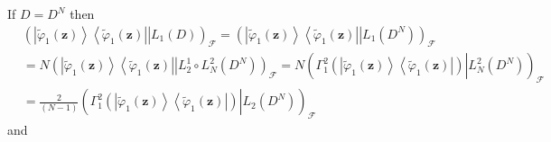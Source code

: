 \documentclass[aps,preprint]{revtex4}%
\begin{document}
If $D=D^{N}$ then
\begin{align}
&  \left(  \left.  \left\vert \tilde{\varphi}_{1}\left(  \mathbf{z}\right)
\right\rangle \left\langle \tilde{\varphi}_{1}\left(  \mathbf{z}\right)
\right\vert \right\vert L_{1}\left(  D\right)  \right)  _{\mathcal{F}}=\left(
\left.  \left\vert \tilde{\varphi}_{1}\left(  \mathbf{z}\right)  \right\rangle
\left\langle \tilde{\varphi}_{1}\left(  \mathbf{z}\right)  \right\vert
\right\vert L_{1}\left(  D^{N}\right)  \right)  _{\mathcal{F}}\nonumber\\
&  =N\left(  \left.  \left\vert \tilde{\varphi}_{1}\left(  \mathbf{z}\right)
\right\rangle \left\langle \tilde{\varphi}_{1}\left(  \mathbf{z}\right)
\right\vert \right\vert L_{2}^{1}\circ L_{N}^{2}\left(  D^{N}\right)  \right)
_{\mathcal{F}}=N\left(  \left.  \overset{}{\Gamma_{1}^{2}\left(  \left\vert
\tilde{\varphi}_{1}\left(  \mathbf{z}\right)  \right\rangle \left\langle
\tilde{\varphi}_{1}\left(  \mathbf{z}\right)  \right\vert \right)
}\right\vert L_{N}^{2}\left(  D^{N}\right)  \right)  _{\mathcal{F}}\nonumber\\
&  =\frac{2}{\left(  N-1\right)  }\left(  \left.  \overset{}{\Gamma_{1}%
^{2}\left(  \left\vert \tilde{\varphi}_{1}\left(  \mathbf{z}\right)
\right\rangle \left\langle \tilde{\varphi}_{1}\left(  \mathbf{z}\right)
\right\vert \right)  }\right\vert L_{2}\left(  D^{N}\right)  \right)
_{\mathcal{F}}%
\end{align}
and
\end{document}
